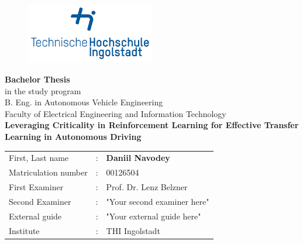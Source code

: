 

\begin{titlepage}	
		\begin{figure}[!h]
			\centering
			\includegraphics[width={0.5\textwidth}]{images/thiRGB.jpg}	
		\end{figure}																			
	
	\begin{center}
		\hrulefill 
	\end{center}
	
	
	\begin{center}	
		\vspace{1cm}
		
		\huge\textbf{
			Bachelor Thesis}\\[1em]
		\normalsize
			in the study program \\ B. Eng. in Autonomous Vehicle Engineering\\ Faculty of Electrical Engineering and Information Technology\\ [8em]
	
		\Large\textbf{Leveraging Criticality in Reinforcement Learning for Effective Transfer Learning in Autonomous Driving}	 \\ [10em]

	\end{center}
	
	
	\begin{tabular}{lll}
		First, Last name &:& \textbf{Daniil Navodey}	\\ [1em]
		
		Matriculation number &:& 00126504 \\[3em]
		
		First Examiner &:& Prof. Dr. Lenz Belzner	\\ [1em]
		Second Examiner &:& "Your second examiner here"	\\ [2em]
		
		External guide &:& "Your external guide here" \\[3em]
		
		Institute &:& THI Ingolstadt \\
	\end{tabular}
	
\end{titlepage}

\restoregeometry
